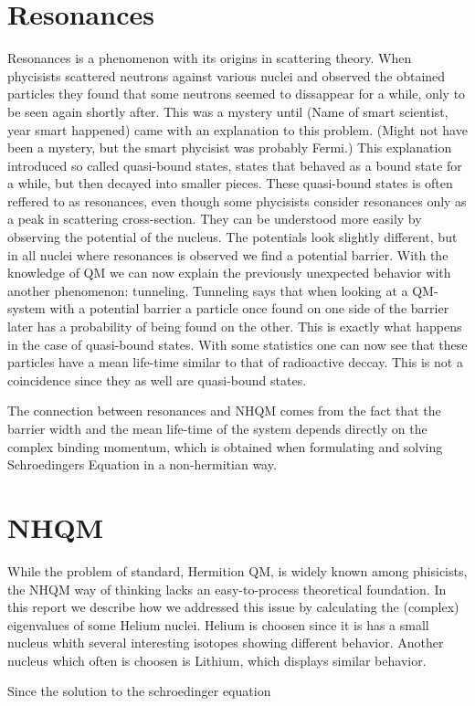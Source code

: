 \documentclass[12pt,a4paper]{article}
\begin{document}
\section{Resonances}
Resonances is a phenomenon with its origins in scattering theory.
When phycisists scattered neutrons against various nuclei and observed the obtained particles they found that some neutrons seemed to dissappear for a while,
 only to be seen again shortly after.
This was a mystery until (Name of smart scientist, year smart happened) came with an explanation to this problem. (Might not have been a mystery, but the smart phycisist was probably Fermi.)
This explanation introduced so called quasi-bound states, states that behaved as a bound state for a while, but then decayed into smaller pieces.
These quasi-bound states is often reffered to as resonances, even though some phycisists consider resonances only as a peak in scattering cross-section.
They can be understood more easily by observing the potential of the nucleus.
The potentials look slightly different, but in all nuclei where resonances is observed we find a potential barrier.
With the knowledge of QM we can now explain the previously unexpected behavior with another phenomenon: tunneling.
Tunneling says that when looking at a QM-system with a potential barrier a particle once found on one side of the barrier later has a probability of being found on the other.
This is exactly what happens in the case of quasi-bound states.
With some statistics one can now see that these particles have a mean life-time similar to that of radioactive deccay.
This is not a coincidence since they as well are quasi-bound states.

The connection between resonances and NHQM comes from the fact that the barrier width and the mean life-time of the system depends directly on the complex binding momentum,
which is obtained when formulating and solving Schroedingers Equation in a non-hermitian way.


\section{NHQM}
While the problem of standard, Hermition QM, is widely known among phisicists, the NHQM way of thinking lacks an easy-to-process theoretical foundation.
In this report we describe how we addressed this issue by calculating the (complex) eigenvalues of some Helium nuclei.
Helium is choosen since it is has a small nucleus whith several interesting isotopes showing different behavior.
Another nucleus which often is choosen is Lithium, which displays similar behavior.

Since the solution to the schroedinger equation 
\end{document}
